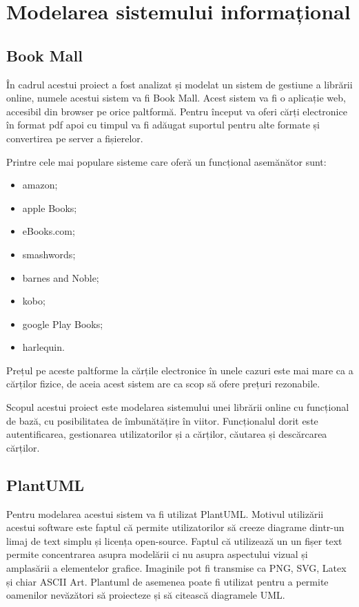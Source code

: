 \clearpage
\section{Modelarea sistemului informațional}

\subsection{Book Mall}

În cadrul acestui proiect a fost analizat și modelat un sistem de gestiune a
librării online, numele acestui sistem va fi Book Mall. Acest sistem va fi o
aplicație web, accesibil din browser pe orice paltformă. Pentru început va
oferi cărți electronice în format pdf apoi cu timpul va fi adăugat suportul
pentru alte formate și convertirea pe server a fișierelor.

Printre cele mai populare sisteme care oferă un funcțional asemănător sunt:
\begin{itemize}
    \item amazon;
    \item apple Books;
    \item eBooks.com;
    \item smashwords;
    \item barnes and Noble;
    \item kobo;
    \item google Play Books;
    \item harlequin.
\end{itemize}
Prețul pe aceste paltforme la cărțile electronice în unele cazuri este mai mare ca a cărților fizice, de aceia acest sistem are ca scop să ofere prețuri rezonabile.

Scopul acestui proiect este modelarea sistemului unei librării online cu funcțional de bază, cu posibilitatea de îmbunătățire în viitor. Funcționalul dorit este autentificarea, gestionarea utilizatorilor și a cărților, căutarea și descărcarea cărților.

\subsection{PlantUML}
Pentru modelarea acestui sistem va fi utilizat PlantUML\cite{PlantUML}. Motivul utilizării
acestui software este faptul că permite utilizatorilor să creeze diagrame
dintr-un limaj de text simplu și licența open-source. Faptul că utilizează un
un fișer text permite concentrarea asupra modelării ci nu asupra aspectului
vizual și amplasării a elementelor grafice. Imaginile pot fi transmise ca PNG,
SVG, Latex și chiar ASCII Art. Plantuml de asemenea poate fi utilizat pentru a
permite oamenilor nevăzători să proiecteze și să citească diagramele UML.

